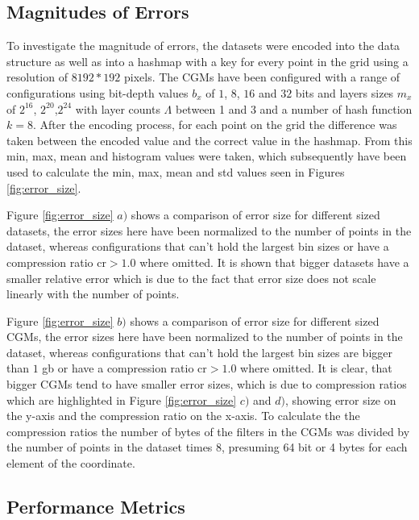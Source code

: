 \documentclass[sigconf, nonacm]{acmart}
\begin{document}
\subsection{Magnitudes of Errors}

To investigate the magnitude of errors, the datasets were encoded into the data structure as well as into a hashmap with a key for every point in the grid using a resolution of $8192*192$ pixels.
The CGMs have been configured with a range of configurations using bit-depth values $b_x$ of $1$, $8$, $16$ and $32$ bits and layers sizes $m_x$ of $2^{16}$, $2^{20}$,$2^{24}$ with layer counts $\Lambda$ between 1 and 3 and a number of hash function $k=8$.
After the encoding process, for each point on the grid the difference was taken between the encoded value and the correct value in the hashmap.
From this min, max, mean and histogram values were taken, which subsequently have been used to calculate the min, max, mean and std values seen in Figures \ref{fig:error_size}.

Figure \ref{fig:error_size} $a)$ shows a comparison of error size for different sized datasets, the error sizes here have been normalized to the number of points in the dataset, whereas configurations that can't hold the largest bin sizes or have a compression ratio $\text{cr} > 1.0$ where omitted.
It is shown that bigger datasets have a smaller relative error which is due to the fact that error size does not scale linearly with the number of points.

Figure \ref{fig:error_size} $b)$ shows a comparison of error size for different sized CGMs, the error sizes here have been normalized to the number of points in the dataset, whereas configurations that can't hold the largest bin sizes are bigger than $1$ gb or have a compression ratio $\text{cr} > 1.0$ where omitted.
It is clear, that bigger CGMs tend to have smaller error sizes, which is due to compression ratios which are highlighted in Figure \ref{fig:error_size} $c)$ and $d)$, showing error size on the y-axis and the compression ratio on the x-axis. To calculate the the compression ratios the number of bytes of the filters in the CGMs was divided by the number of points in the dataset times 8, presuming 64 bit or 4 bytes for each element of the coordinate.


\subsection{Performance Metrics}
\end{document}
